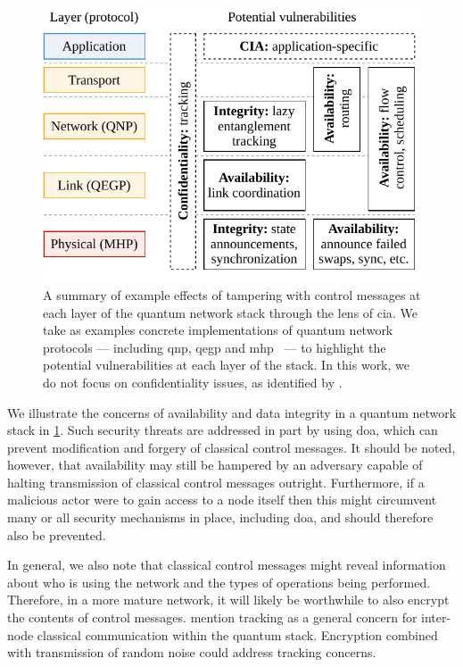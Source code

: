 \begin{figure}[t]
    \centering
    \includegraphics[width=0.6\linewidth]{figures/doa-examples.pdf}
    \caption{
        A summary of example effects of tampering with control messages at each layer of the quantum
        network stack through the lens of \acrfull{cia}. We take as examples concrete
        implementations of quantum network protocols --- including \acrshort{qnp}, \acrshort{qegp} and
        \acrshort{mhp}~\cite{kozlowski_2020_qnp, dahlberg_2019_egp} --- to highlight the
        potential vulnerabilities at each layer of the stack. In this work, we do not focus on
        confidentiality issues, as identified by \textcite{satoh_2020_attacking}.
    }
    \label{fig:doa-examples}
\end{figure}

We illustrate the concerns of availability and data integrity in a quantum network stack in
\cref{fig:doa-examples}. Such security threats are addressed in part by using \acrlong{doa}, which
can prevent modification and forgery of classical control messages. It should be noted, however,
that availability may still be hampered by an adversary capable of halting transmission of classical
control messages outright. Furthermore, if a malicious actor were to gain access to a node itself
then this might circumvent many or all security mechanisms in place, including \acrshort{doa}, and
should therefore also be prevented.

In general, we also note that classical control messages might reveal information about who is using
the network and the types of operations being performed. Therefore, in a more mature network, it
will likely be worthwhile to also encrypt the contents of control messages.
\textcite{satoh_2020_attacking} mention tracking as a general concern for inter-node classical
communication within the quantum stack. Encryption combined with transmission of random noise could
address tracking concerns.

